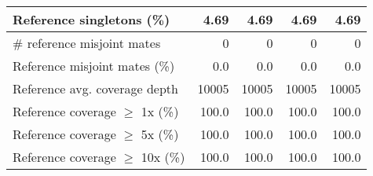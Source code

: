 \documentclass[12pt,a4paper]{article}
\begin{document}
\begin{table}[ht]
\begin{center}
\begin{tabular}{|l*{4}{|r}|}
Reference singletons (\%) & 4.69 & 4.69 & 4.69 & 4.69 \\ \hline
\# reference misjoint mates & 0 & 0 & 0 & 0 \\ \hline
Reference misjoint mates (\%) & 0.0 & 0.0 & 0.0 & 0.0 \\ \hline
Reference avg. coverage depth & 10005 & 10005 & 10005 & 10005 \\ \hline
Reference coverage $\geq$ 1x (\%) & 100.0 & 100.0 & 100.0 & 100.0 \\ \hline
Reference coverage $\geq$ 5x (\%) & 100.0 & 100.0 & 100.0 & 100.0 \\ \hline
Reference coverage $\geq$ 10x (\%) & 100.0 & 100.0 & 100.0 & 100.0 \\ \hline
\end{tabular}
\end{center}
\end{table}
\end{document}
